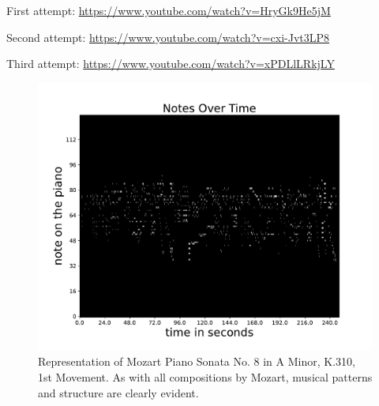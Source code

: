 \documentclass[11pt]{article}
\begin{document}
First attempt: \url{https://www.youtube.com/watch?v=HryGk9He5jM}

Second attempt: \url{https://www.youtube.com/watch?v=cxi-Jvt3LP8}

Third attempt: \url{https://www.youtube.com/watch?v=xPDLlLRkjLY}

\begin{figure}[H]
    \includegraphics[trim={0 0 0 0},clip,width=0.95\linewidth]{tree_music(original mozart)}
    \centering
    \caption{
        Representation of Mozart Piano Sonata No. 8 in A 
    Minor, K.310, 1st Movement. As with all compositions by Mozart, musical 
    patterns and structure are clearly evident.
    }
\end{figure}

\newpage
\end{document}
